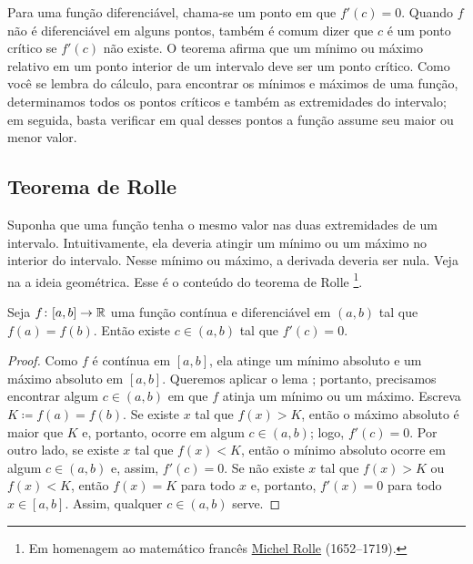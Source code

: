 Para uma função diferenciável, chama-se
\emph{} um ponto em que
$f'(c) = 0$. Quando $f$ não é diferenciável em alguns pontos,
também é comum dizer que $c$ é um ponto crítico
se $f'(c)$ não existe.
O teorema afirma que um mínimo ou máximo relativo em um ponto interior
de um intervalo deve ser um ponto crítico.
Como você se lembra do cálculo, para encontrar os mínimos e máximos de uma
função, determinamos todos os pontos críticos e também as extremidades
do intervalo; em seguida, basta verificar em qual desses pontos
a função assume seu maior ou menor valor.

\subsection{Teorema de Rolle}

Suponha que uma função tenha o mesmo valor nas duas extremidades de um intervalo.
Intuitivamente, ela deveria atingir um mínimo ou um máximo no interior do
intervalo.
Nesse mínimo ou máximo, a derivada deveria ser nula.
Veja na  a ideia geométrica.
Esse é o conteúdo do teorema de Rolle%
\footnote{Em homenagem ao matemático francês
\href{https://en.wikipedia.org/wiki/Michel_Rolle}{Michel Rolle}
(1652--1719).}.

\begin{myfigureht}
\caption{Ponto em que a reta tangente é horizontal, isto é, $f'(c) =
0$.\label{rollefig}}
\end{myfigureht}

\begin{thm}[Rolle] \label{thm:rolle}
Seja $f \colon [a,b] \to {\mathbb{R}}$ uma função contínua
e diferenciável em $(a,b)$ tal que $f(a) = f(b)$.
Então existe $c \in (a,b)$ tal que $f'(c) = 0$.
\end{thm}

\begin{proof}
Como $f$ é contínua em $[a,b]$, ela atinge um mínimo absoluto e um
máximo absoluto em $[a,b]$. Queremos aplicar o
lema ; portanto,
precisamos encontrar algum $c \in (a,b)$ em que $f$ atinja um mínimo ou
um máximo.
Escreva $K \coloneqq f(a) = f(b)$.
Se existe $x$ tal que $f(x) > K$, então o máximo absoluto é maior que $K$
e, portanto, ocorre em algum $c \in (a,b)$; logo, $f'(c) = 0$.
Por outro lado, se existe $x$ tal que $f(x) < K$, então o mínimo absoluto
ocorre em algum $c \in (a,b)$ e, assim, $f'(c) = 0$. Se não existe $x$ tal que
$f(x) > K$ ou
$f(x) < K$, então $f(x) = K$ para todo $x$ e, portanto,
$f'(x) = 0$ para todo $x \in [a,b]$. Assim, qualquer $c \in (a,b)$ serve.
\end{proof}

